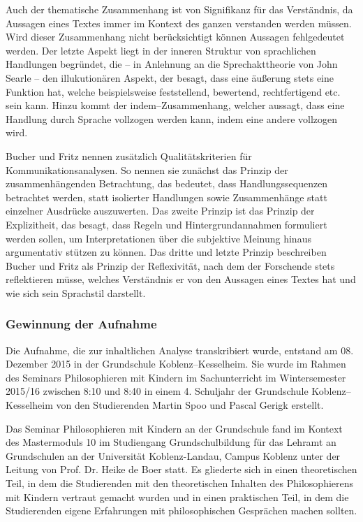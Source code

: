 Auch der thematische Zusammenhang ist von Signifikanz für das Verständnis, da Aussagen eines Textes immer im Kontext des ganzen verstanden werden müssen. 
Wird dieser Zusammenhang nicht berücksichtigt können Aussagen fehlgedeutet werden. 
Der letzte Aspekt liegt in der inneren Struktur von sprachlichen Handlungen begründet, die -- in Anlehnung an die Sprechakttheorie von John Searle -- den illukutionären Aspekt, der besagt, dass eine äußerung stets eine Funktion hat, welche beispielsweise feststellend, bewertend, rechtfertigend etc. sein kann. 
Hinzu kommt der indem--Zusammenhang, welcher aussagt, dass eine Handlung durch Sprache vollzogen werden kann, indem eine andere vollzogen wird\cite[S.\, 137f]{HB80}.

Bucher und Fritz nennen zusätzlich Qualitätskriterien für Kommunikationsanalysen. 
So nennen sie zunächst das Prinzip der zusammenhängenden Betrachtung, das bedeutet, dass Handlungssequenzen betrachtet werden, statt isolierter Handlungen sowie Zusammenhänge statt einzelner Ausdrücke auszuwerten\cite[S.\,137f]{HB80}.
 Das zweite Prinzip ist das Prinzip der Explizitheit, das besagt, dass Regeln und Hintergrundannahmen formuliert werden sollen, um Interpretationen über die subjektive Meinung hinaus argumentativ stützen zu können. 
 Das dritte und letzte Prinzip beschreiben Bucher und Fritz als Prinzip der Reflexivität, nach dem der Forschende stets reflektieren müsse, welches Verständnis er von den Aussagen eines Textes hat und wie sich sein Sprachstil darstellt\cite[S.\,143]{HB80}.
 
 \newpage
 
 


\subsubsection{Gewinnung der Aufnahme}

Die Aufnahme, die zur inhaltlichen Analyse transkribiert wurde, entstand am 08. Dezember 2015 in der Grundschule Koblenz--Kesselheim. 
Sie wurde im Rahmen des Seminars \glqq Philosophieren mit Kindern im Sachunterricht\grqq{} im Wintersemester 2015/16 zwischen 8:10 und 8:40 in einem 4. Schuljahr der Grundschule Koblenz--Kesselheim von den Studierenden Martin Spoo und Pascal Gerigk erstellt. 

Das Seminar \glqq Philosophieren mit Kindern an der Grundschule\grqq{} fand im Kontext des Mastermoduls 10 im Studiengang Grundschulbildung für das Lehramt an Grundschulen an der Universität Koblenz-Landau, Campus Koblenz unter der Leitung von Prof. Dr. Heike de Boer statt. 
Es gliederte sich in einen theoretischen Teil, in dem die Studierenden mit den theoretischen Inhalten des Philosophierens mit Kindern vertraut gemacht wurden und in einen praktischen Teil, in dem die Studierenden eigene Erfahrungen mit philosophischen Gesprächen machen sollten.

